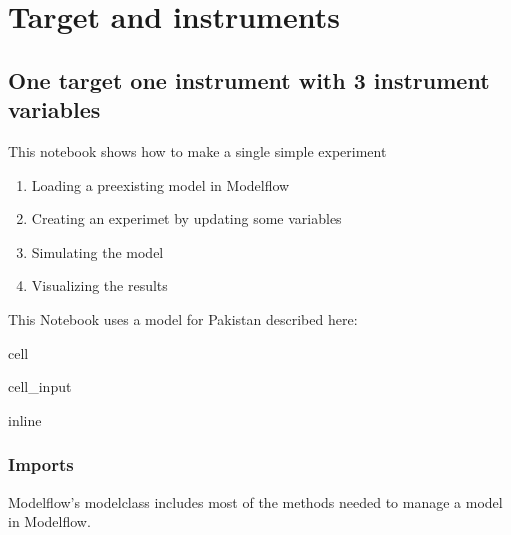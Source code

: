 \documentclass[letterpaper,10pt,english]{jupyterBook}
\begin{document}
\part{Target and instruments}

\sphinxstepscope


\chapter{One target one instrument with 3 instrument variables}
\label{\detokenize{content/howto/targetinstruments/One target one instrument with 3 instrument variables:one-target-one-instrument-with-3-instrument-variables}}\label{\detokenize{content/howto/targetinstruments/One target one instrument with 3 instrument variables::doc}}
\sphinxAtStartPar
This notebook shows how to make a single simple experiment
\begin{enumerate}
%
\item {} 
\sphinxAtStartPar
Loading a pre\sphinxhyphen{}existing model in Modelflow

\item {} 
\sphinxAtStartPar
Creating an experimet by updating some variables

\item {} 
\sphinxAtStartPar
Simulating the model

\item {} 
\sphinxAtStartPar
Visualizing the results

\end{enumerate}

\sphinxAtStartPar
This Notebook uses a  model for Pakistan described here: 

\begin{sphinxuseclass}{cell}\begin{sphinxVerbatimInput}

\begin{sphinxuseclass}{cell_input}
\begin{sphinxVerbatim}[commandchars=\\\{\}]
 inline
\end{sphinxVerbatim}

\end{sphinxuseclass}\end{sphinxVerbatimInput}

\end{sphinxuseclass}

\section{Imports}
\label{\detokenize{content/howto/targetinstruments/One target one instrument with 3 instrument variables:imports}}
\sphinxAtStartPar
Modelflow’s modelclass includes most of the methods needed to manage a model in Modelflow.
\end{document}
